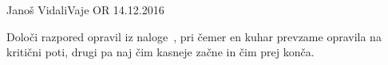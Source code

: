 \begin{naloga}{Janoš Vidali}{Vaje OR 14.12.2016}
\begin{vprasanje}
Določi razpored opravil iz naloge~,
pri čemer en kuhar prevzame opravila na kritični poti,
drugi pa naj čim kasneje začne in čim prej konča.
\end{vprasanje}
\begin{odgovor}
\end{odgovor}
\end{naloga}

